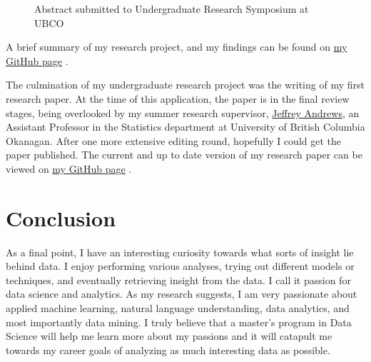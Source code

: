 \documentclass[12pt]{article} %
\begin{document}
\begin{figure}[H]
\caption{Abstract submitted to Undergraduate Research Symposium at UBCO}
\label{fig:abstract}
\end{figure}

A brief summary of my research project, and my findings can be found on \href{https://github.com/norberte/Feature-Based-Opinion-Mining/blob/master/URA\%20Research\%20Summary.pdf}{my GitHub page} \cite{URA_summary}.

The culmination of my undergraduate research project was the writing of my first research paper. At the time of this application, the paper is in the final review stages, being overlooked by my summer research supervisor, \href{http://stat.ok.ubc.ca/faculty/andrews.html}{Jeffrey Andrews}, an Assistant Professor in the Statistics department at University of British Columbia Okanagan. After one more extensive editing round, hopefully I could get the paper published. The current and up to date version of my research paper can be viewed on \href{https://github.com/norberte/Latex-Research-Paper/blob/master/Research\%20Paper.pdf}{my GitHub page} \cite{paper}.



\section{Conclusion} %
As a final point, I have an interesting curiosity towards what sorts of insight lie behind data. I enjoy performing various analyses, trying out different models or techniques, and eventually retrieving insight from the data. I call it passion for data science and analytics. As my research suggests, I am very passionate about applied machine learning, natural language understanding, data analytics, and most importantly data mining. I truly believe that a master's program in Data Science will help me learn more about my passions and it will catapult me towards my career goals of analyzing as much interesting data as possible.

\end{document}
